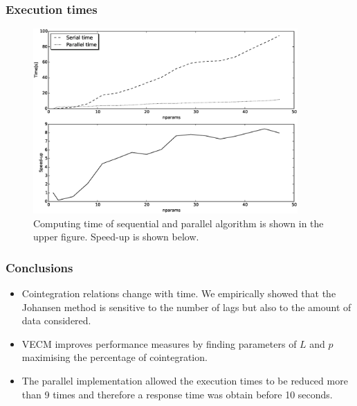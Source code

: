 \documentclass{beamer}
\begin{document}
%
\begin{frame}
\frametitle{Execution times}
\begin{figure}[ht]
  \centering
  \includegraphics[width=0.9\textwidth]{img/51_Fig3}
  \caption[Computing time and Speed-up]{Computing time of sequential and parallel algorithm is shown in the
  upper figure. Speed-up is shown below.}
  \label{fig:extimes}
\end{figure}
\end{frame}

\begin{frame}
\frametitle{Conclusions}
\begin{itemize}
\item Cointegration relations change with time. We empirically showed that the Johansen method is sensitive to the number of lags but also to the amount of data considered.
\item VECM improves performance measures by finding
parameters of $L$ and $p$ maximising the percentage of cointegration.
\item The parallel implementation allowed the execution times to be reduced
more than 9 times and therefore a response time was obtain before 10
seconds. 
\end{itemize}
\end{frame}
\end{document}
